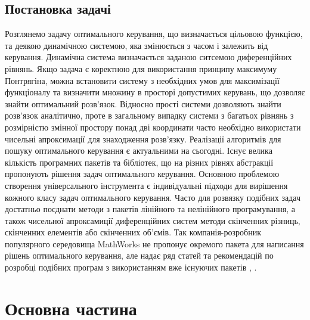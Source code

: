 \documentclass[a4paper,12pt]{extreport}
\begin{document}
\section{Постановка задачі} 
Розглянемо задачу оптимального керування, що визначається цільовою функцією, та деякою динамічною системою, яка змінюється з часом і залежить від
керування. Динамічна система визначається заданою ситсемою диференційних рівнянь. Якщо задача є коректною для використання 
принципу максимуму Понтрягіна, можна
встановити систему з необхідних умов для максимізації функціоналу та визначити
множину в просторі допустимих керувань, що дозволяє знайти оптимальний розв'язок. 
Відносно прості системи дозволяють знайти розв'язок аналітично, проте в загальному випадку системи з багатьох рівнянь 
з розмірністю змінної простору понад дві координати часто необхідно використати чисельні апроксимації для знаходження 
розв'язку. Реалізації алгоритмів для пошуку оптимального керування є актуальними на сьогодні. Існує велика кількість програмних
пакетів та бібліотек, що на різних рівнях абстракції пропонують рішення задач оптимального керування. Основною проблемою 
створення універсального інструмента є індивідуальні підходи для вирішення кожного класу задач оптимального керування.  
Часто для розвязку подібних задач достатньо поєднати методи з пакетів лінійного та нелінійного програмування, а також чисельної 
апроксамиції диференційних систем методи скінченних різниць, скінченних елементів або скінченних об'ємів. Так компанія-розробник 
популярного середовища MathWorks не пропонує окремого пакета для написання рішень оптимального керування, але надає ряд статей 
та рекомендацій по розробці подібних програм з використанням вже існуючих пакетів \cite{1}, \cite{2}. 
\chapter{Основна частина} 
\end{document}
